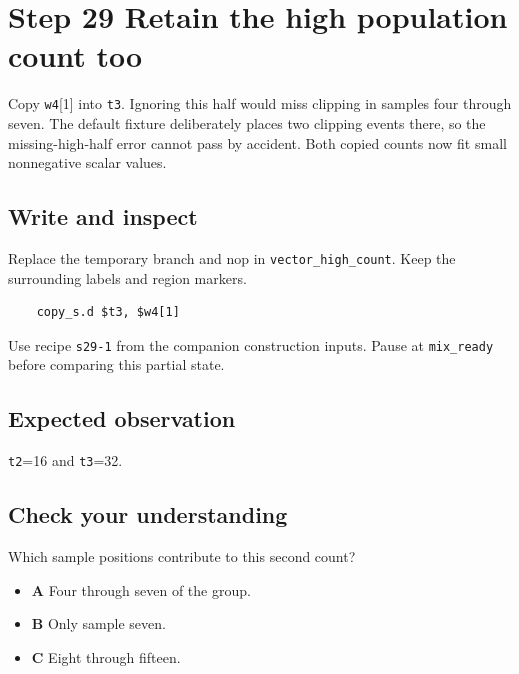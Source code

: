 \section{Step 29 Retain the high population count too}\label{pcm-s29}

Copy \texttt{w4}[1] into \texttt{t3}. Ignoring this half would miss clipping in samples four through seven. The default fixture deliberately places two clipping events there, so the missing-high-half error cannot pass by accident. Both copied counts now fit small nonnegative scalar values.

\subsection{Write and inspect}
Replace the temporary branch and nop in \texttt{vector\_high\_count}. Keep the surrounding labels and region markers.

\begin{verbatim}
    copy_s.d $t3, $w4[1]
\end{verbatim}
Use recipe \texttt{s29-1} from the companion construction inputs. Pause at \texttt{mix\_ready} before comparing this partial state.

\subsection{Expected observation}
\texttt{t2}=16 and \texttt{t3}=32.

\subsection{Check your understanding}
Which sample positions contribute to this second count?

\begin{itemize}
\item \textbf{A} Four through seven of the group.
\item \textbf{B} Only sample seven.
\item \textbf{C} Eight through fifteen.
\end{itemize}
